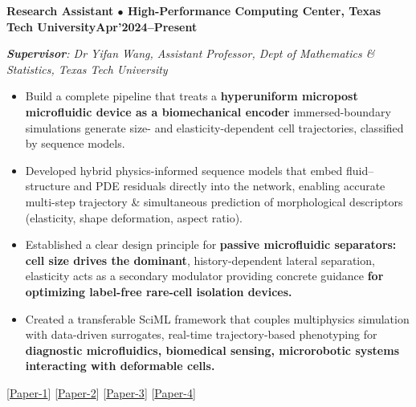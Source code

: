 \documentclass[10pt,letterpaper]{article}
\newcommand{\entry}[2]{\vspace{2pt}\par\noindent\textbf{#1}\hfill\textbf{#2}\par\nopagebreak}
\newcommand{\supv}[1]{\noindent\hspace{0.8em}\textit{\textbf{Supervisor}: #1}\par\nopagebreak}
\newcommand{\lk}[2]{[\href{#1}{#2}]}
\begin{document}
\entry{Research Assistant $\bullet$ High-Performance Computing Center, Texas Tech University}{Apr'2024--Present}
\supv{Dr Yifan Wang, Assistant Professor, Dept of Mathematics \& Statistics, Texas Tech University}
\begin{itemize}
  \item Build a complete pipeline that treats a \textbf{hyperuniform micropost microfluidic device as a biomechanical encoder} immersed-boundary simulations generate size- and elasticity-dependent cell trajectories, classified by sequence models.
  \item Developed hybrid physics-informed sequence models that embed fluid--structure and PDE residuals directly into the network, enabling accurate multi-step trajectory \& simultaneous prediction of morphological descriptors (elasticity, shape deformation, aspect ratio).
  \item Established a clear design principle for \textbf{passive microfluidic separators: cell size drives the dominant}, history-dependent lateral separation, elasticity acts as a secondary modulator providing concrete guidance \textbf{for optimizing label-free rare-cell isolation devices.}
  \item Created a transferable SciML framework that couples multiphysics simulation with data-driven surrogates, real-time trajectory-based phenotyping for \textbf{diagnostic microfluidics, biomedical sensing, microrobotic systems interacting with deformable cells.}
\end{itemize}
\hspace{1.6em}\lk{https://link.springer.com/chapter/10.1007/978-3-031-94898-5_34}{Paper-1} \lk{https://onlinelibrary.wiley.com/doi/10.1002/cnm.70037}{Paper-2} \lk{https://drive.google.com/file/d/1UfsILbMxbepeqWYiI7ZbkmEcKGcu33Yc/view?usp=sharing}{Paper-3} \lk{https://drive.google.com/file/d/1usXiM33oELEwZXtblLrIkoFmStO5hNIO/view?usp=sharing}{Paper-4}
\end{document}
